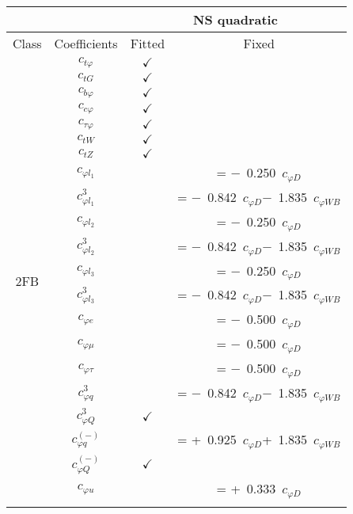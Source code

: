 \documentclass{article}
\begin{document}
\begin{table}[H]
\centering
\begin{tabular}{|c|c|c|c|}
\hline
 &  & \multicolumn{2}{c|}{NS quadratic}  \\ \hline
Class & Coefficients & Fitted & Fixed  \\ \hline
\multirow{24}{*}{2FB}
 & $c_{t \varphi}$ & $\checkmark$ & \\ \cline{2-4}
 & $c_{tG}$ & $\checkmark$ & \\ \cline{2-4}
 & $c_{b \varphi}$ & $\checkmark$ & \\ \cline{2-4}
 & $c_{c \varphi}$ & $\checkmark$ & \\ \cline{2-4}
 & $c_{\tau \varphi}$ & $\checkmark$ & \\ \cline{2-4}
 & $c_{tW}$ & $\checkmark$ & \\ \cline{2-4}
 & $c_{tZ}$ & $\checkmark$ & \\ \cline{2-4}
 & $c_{\varphi l_1}$ & & = $-$\ 0.250\ $c_{\varphi D}$\\ \cline{2-4}
 & $c_{\varphi l_1}^{3}$ & & = $-$\ 0.842\ $c_{\varphi D}$$-$\ 1.835\ $c_{\varphi WB}$\\ \cline{2-4}
 & $c_{\varphi l_2}$ & & = $-$\ 0.250\ $c_{\varphi D}$\\ \cline{2-4}
 & $c_{\varphi l_2}^{3}$ & & = $-$\ 0.842\ $c_{\varphi D}$$-$\ 1.835\ $c_{\varphi WB}$\\ \cline{2-4}
 & $c_{\varphi l_3}$ & & = $-$\ 0.250\ $c_{\varphi D}$\\ \cline{2-4}
 & $c_{\varphi l_3}^{3}$ & & = $-$\ 0.842\ $c_{\varphi D}$$-$\ 1.835\ $c_{\varphi WB}$\\ \cline{2-4}
 & $c_{\varphi e}$ & & = $-$\ 0.500\ $c_{\varphi D}$\\ \cline{2-4}
 & $c_{\varphi \mu}$ & & = $-$\ 0.500\ $c_{\varphi D}$\\ \cline{2-4}
 & $c_{\varphi \tau}$ & & = $-$\ 0.500\ $c_{\varphi D}$\\ \cline{2-4}
 & $c_{\varphi q}^{3}$ & & = $-$\ 0.842\ $c_{\varphi D}$$-$\ 1.835\ $c_{\varphi WB}$\\ \cline{2-4}
 & $c_{\varphi Q}^{3}$ & $\checkmark$ & \\ \cline{2-4}
 & $c_{\varphi q}^{(-)}$ & & = +\ 0.925\ $c_{\varphi D}$+\ 1.835\ $c_{\varphi WB}$\\ \cline{2-4}
 & $c_{\varphi Q}^{(-)}$ & $\checkmark$ & \\ \cline{2-4}
 & $c_{\varphi u}$ & & = +\ 0.333\ $c_{\varphi D}$\\ \cline{2-4}

\end{tabular}
\end{table}
\end{document}

